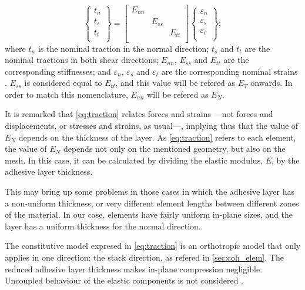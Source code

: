 \documentclass[cmfonts]{witpress}
\begin{document}
\begin{equation}
\begin{Bmatrix}
t_n \\
t_s \\
t_t \\
\end{Bmatrix}
=
\begin{bmatrix}
E_{nn} & & \\
& E_{ss} & \\
& & E_{tt} \\
\end{bmatrix}
\begin{Bmatrix}
\varepsilon_n \\
\varepsilon_s \\
\varepsilon_t \\
\end{Bmatrix} ;
\label{eq:traction}
\end{equation}
where $t_n$ is the nominal traction in the normal direction; $t_s$ and $t_t$ are the nominal tractions in both shear directions; $E_{nn}$, $E_{ss}$ and $E_{tt}$ are the corresponding stiffnesses; and $\varepsilon_n$, $\varepsilon_s$ and $\varepsilon_t$ are the corresponding nominal strains \cite{Abaqus613Manual}. $E_{ss}$ is considered equal to $E_{tt}$, and this value will be refered as $E_{T}$ onwards. In order to match this nomenclature, $E_{nn}$ will be refered as $E_{N}$.

It is remarked that \cref{eq:traction} relates forces and strains ---not forces and displacements, or stresses and strains, as usual---, implying thus that the value of $E_{N}$ depends on the thickness of the layer. As \cref{eq:traction} refers to each element, the value of $E_{N}$ depends not only on the mentioned geometry, but also on the mesh. In this case, it can be calculated by dividing the elastic modulus, $E$, by the adhesive layer thickness.

This may bring up some problems in those cases in which the adhesive layer has a non-uniform thickness, or very different element lengths between different zones of the material. In our case, elements have fairly uniform in-plane sizes, and the layer has a uniform thickness for the normal direction.

The constitutive model expresed in \cref{eq:traction} is an orthotropic model that only applies in one direction: the stack direction, as refered in \cref{sec:coh_elem}. The reduced adhesive layer thickness makes in-plane compression negligible. Uncoupled behaviour of the elastic components is not considered \cite{Scattina2011}.
\end{document}
